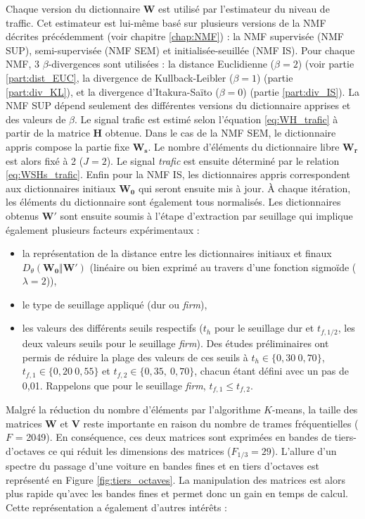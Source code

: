 Chaque version du dictionnaire $\mathbf{W}$ est utilisé par l'estimateur du niveau de traffic. Cet estimateur est lui-même basé sur plusieurs versions de la NMF décrites précédemment (voir chapitre \ref{chap:NMF})  : la NMF supervisée (NMF SUP), semi-supervisée (NMF SEM) et initialisée-seuillée (NMF IS). Pour chaque NMF, 3 $\beta$-divergences sont utilisées : la distance Euclidienne ($\beta = 2$) (voir partie \ref{part:dist_EUC}, la divergence de Kullback-Leibler ($\beta = 1$) (partie \ref{part:div_KL}), et la divergence d'Itakura-Saïto ($\beta = 0$) (partie \ref{part:div_IS}). La NMF SUP dépend seulement des différentes versions du dictionnaire apprises et des valeurs de $\beta$. Le signal trafic est estimé selon l'équation \ref{eq:WH_trafic} à partir de la matrice $\mathbf{H}$ obtenue.
Dans le cas de la NMF SEM, le dictionnaire appris compose la partie fixe $\mathbf{W_s}$. Le nombre d'éléments du dictionnaire libre $\mathbf{W_r}$ est alors fixé à 2 ($J = 2$). Le signal \textit{trafic} est ensuite déterminé par le relation \ref{eq:WSHs_trafic}.
Enfin pour la NMF IS, les dictionnaires appris correspondent aux dictionnaires initiaux $\mathbf{W_0}$ qui seront ensuite mis à jour. À chaque itération, les éléments du dictionnaire sont également tous normalisés. Les dictionnaires obtenus $\mathbf{W'}$ sont ensuite soumis à l'étape d'extraction par seuillage qui implique également plusieurs facteurs expérimentaux :

\begin{itemize}
\item la représentation de la distance entre les dictionnaires initiaux et finaux $D_{\theta}(\mathbf{W_0} \Vert \mathbf{W'})$ (linéaire ou bien exprimé au travers d'une fonction sigmoïde ($\lambda = 2$)),
\item le type de seuillage appliqué (dur ou \textit{firm}),
\item les valeurs des différents seuils respectifs ($t_h$ pour le seuillage dur et $t_{f,1/2}$, les deux valeurs seuils pour le seuillage \textit{firm}). Des études préliminaires ont permis de réduire la plage des valeurs de ces seuils à $t_h \in \lbrace 0,30~0,70 \rbrace$, $t_{f,1} \in \lbrace 0,20~0,55 \rbrace$ et $t_{f,2} \in \lbrace 0,35,~0,70 \rbrace$, chacun étant défini avec un pas de 0,01. Rappelons que pour le seuillage \textit{firm}, $t_{f,1} \leq t_{f,2}$.
\end{itemize}

Malgré la réduction du nombre d'éléments par l'algorithme $K$-means, la taille des matrices $\mathbf{W}$ et $\mathbf{V}$ reste importante en raison du nombre de trames fréquentielles ($F$ = 2049). En conséquence, ces deux matrices sont exprimées en bandes de tiers-d'octaves ce qui réduit les dimensions des matrices ($F_{1/3} = 29$). L'allure d'un spectre du passage d'une voiture en bandes fines et en tiers d'octaves est représenté en Figure \ref{fig:tiers_octaves}. La manipulation des matrices est alors plus rapide qu'avec les bandes fines et permet donc un gain en temps de calcul. Cette représentation a également d'autres intérêts :

